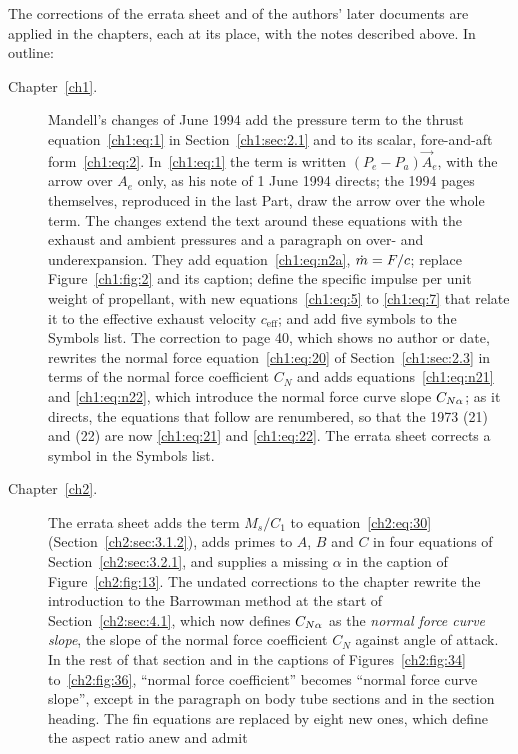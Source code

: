 The corrections of the errata sheet and of the authors' later documents are applied in the
chapters, each at its place, with the notes described above. In outline:
\begin{description}
  \item[Chapter~\ref{ch1}.] Mandell's changes of June 1994 add the pressure term to the thrust
    equation~\eqref{ch1:eq:1} in Section~\ref{ch1:sec:2.1} and to its scalar, fore-and-aft
    form~\eqref{ch1:eq:2}. In~\eqref{ch1:eq:1} the term is written $(P_e - P_a)\vec{A}_e$, with the
    arrow over $A_e$ only, as his note of 1 June 1994 directs; the 1994 pages themselves, reproduced
    in the last Part, draw the arrow over the whole term. The changes extend the text around these
    equations with the exhaust and ambient pressures and a paragraph on over- and underexpansion. They add
    equation~\eqref{ch1:eq:n2a}, $\dot{m} = F/c$; replace Figure~\ref{ch1:fig:2} and its caption;
    define the specific impulse per unit weight of propellant, with new equations~\eqref{ch1:eq:5}
    to \eqref{ch1:eq:7} that relate it to the effective exhaust velocity $c_{\mathrm{eff}}$; and add
    five symbols to the Symbols list. The correction to page 40, which shows no author or date,
    rewrites the normal force equation~\eqref{ch1:eq:20} of Section~\ref{ch1:sec:2.3} in terms of
    the normal force coefficient $C_N$ and adds equations~\eqref{ch1:eq:n21} and
    \eqref{ch1:eq:n22}, which introduce the normal force curve slope $C_{N\alpha}$; as it directs, the
    equations that follow are renumbered, so that the 1973 (21) and (22) are now
    \eqref{ch1:eq:21} and \eqref{ch1:eq:22}. The errata sheet corrects a symbol in the Symbols
    list.
  \item[Chapter~\ref{ch2}.] The errata sheet adds the term $M_s/C_1$ to
    equation~\eqref{ch2:eq:30} (Section~\ref{ch2:sec:3.1.2}), adds primes to $A$, $B$ and $C$ in
    four equations of Section~\ref{ch2:sec:3.2.1}, and supplies a missing $\alpha$ in
    the caption of Figure~\ref{ch2:fig:13}. The undated corrections to the chapter rewrite the
    introduction to the Barrowman method at the start of Section~\ref{ch2:sec:4.1}, which now
    defines $C_{N\alpha}$ as the \emph{normal force curve slope}, the slope of the normal force coefficient
    $C_N$ against angle of attack. In the rest of that section and in the captions of
    Figures~\ref{ch2:fig:34} to~\ref{ch2:fig:36}, ``normal force coefficient'' becomes ``normal
    force curve slope'', except in the paragraph on body tube sections and in the section heading.
    The fin equations are replaced by eight new ones, which define the aspect ratio anew and admit

\end{description}
